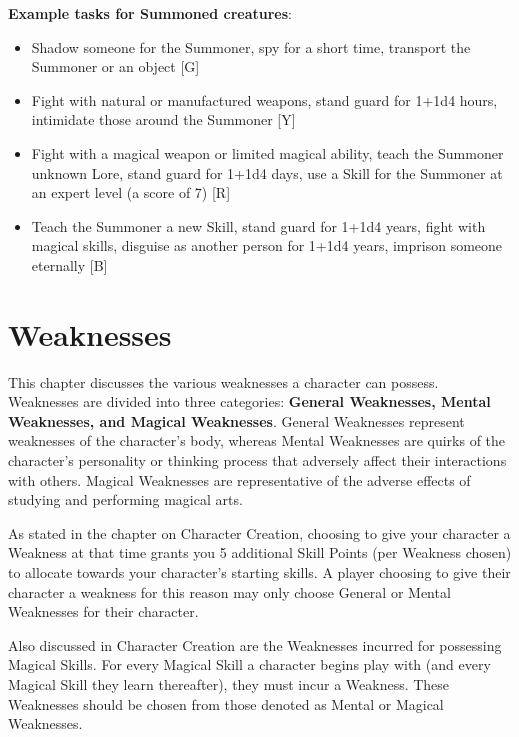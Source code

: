 \documentclass[oneside]{book}
\begin{document}
\begin{multicols}{2}
\textbf{Example tasks for Summoned creatures}: 
	\begin{itemize}
		\setlength{\itemsep}{0cm}%
  		\setlength{\parskip}{0cm}%
		\item{ \small Shadow someone for the Summoner, spy for a short time, transport the Summoner or an object [G]}
		\item{ \small Fight with natural or manufactured weapons, stand guard for 1+1d4 hours, intimidate those around the Summoner  [Y]}
		\item{ \small Fight with a magical weapon or limited magical ability, teach the Summoner unknown Lore, stand guard for 1+1d4 days, use a Skill for the Summoner at an expert level (a score of 7) [R]}
		\item{ \small Teach the Summoner a new Skill, stand guard for 1+1d4 years, fight with magical skills, disguise as another person for 1+1d4 years, imprison someone eternally  [B]}
	\end{itemize}
\end{multicols}

\chapter{Weaknesses}

This chapter discusses the various weaknesses a character can possess. Weaknesses are divided into three categories: \textbf{General Weaknesses, Mental Weaknesses, and Magical Weaknesses}. General Weaknesses represent weaknesses of the character's body, whereas Mental Weaknesses are quirks of the character's personality or thinking process that adversely affect their interactions with others. Magical Weaknesses are representative of the adverse effects of studying and performing magical arts.

As stated in the chapter on Character Creation, choosing to give your character a Weakness at that time grants you 5 additional Skill Points (per Weakness chosen) to allocate towards your character's starting skills. A player choosing to give their character a weakness for this reason may only choose General or Mental Weaknesses for their character. 

Also discussed in Character Creation are the Weaknesses incurred for possessing Magical Skills. For every Magical Skill a character begins play with (and every Magical Skill they learn thereafter), they must incur a Weakness. These Weaknesses should be chosen from those denoted as Mental or Magical Weaknesses.
\end{document}
